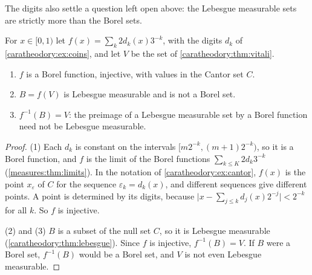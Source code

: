 \begin{notechapter}
The digits also settle a question left open above: the Lebesgue
measurable sets are strictly more than the Borel sets.

\begin{proposition}
\label{caratheodory:prop:nonborel}
For $x\in[0, 1)$ let $f(x) = \sum_k2d_k(x)3^{-k}$, with the digits
$d_k$ of \cref{caratheodory:ex:coins}, and let $V$ be the set of
\cref{caratheodory:thm:vitali}.
\begin{enumerate}[nosep]
  \item $f$ is a Borel function, injective, with values in the Cantor
        set $C$.
  \item $B = f(V)$ is Lebesgue measurable and is not a Borel set.
  \item $f^{-1}(B) = V$: the preimage of a Lebesgue measurable set by
        a Borel function need not be Lebesgue measurable.
\end{enumerate}
\end{proposition}

\begin{proof}
(1) Each $d_k$ is constant on the intervals
$[m2^{-k}, (m + 1)2^{-k})$, so it is a Borel function, and $f$ is the
limit of the Borel functions $\sum_{k\leq K}2d_k3^{-k}$
(\cref{measures:thm:limits}). In the notation of
\cref{caratheodory:ex:cantor}, $f(x)$ is the point $x_\varepsilon$ of
$C$ for the sequence $\varepsilon_k = d_k(x)$, and different sequences
give different points. A point is determined by its digits, because
$\lvert x - \sum_{j\leq k}d_j(x)2^{-j}\rvert < 2^{-k}$ for all $k$. So $f$ is
injective.

(2) and (3) $B$ is a subset of the null set $C$, so it is Lebesgue
measurable (\cref{caratheodory:thm:lebesgue}). Since $f$ is injective,
$f^{-1}(B) = V$. If $B$ were a Borel set, $f^{-1}(B)$ would be a Borel
set, and $V$ is not even Lebesgue measurable.
\end{proof}


\end{notechapter}
